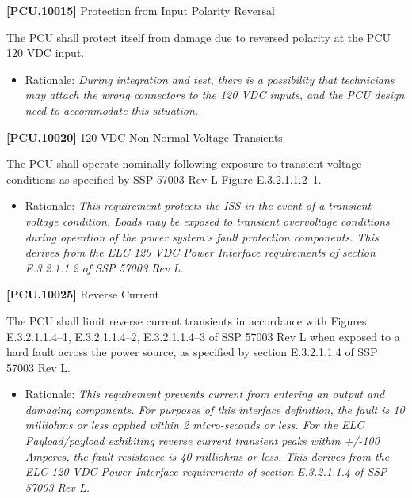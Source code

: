\documentclass[12pt,oneside,oldfontcommands]{memoir}
\begin{document}
\textbf{[PCU.10015]} Protection from Input Polarity Reversal

The \gls{PCU} shall protect itself from damage due to reversed polarity at the \gls{PCU} 120 \gls{VDC} input.

\begin{itemize}
\item{} Rationale: \emph{During integration and test, there is a possibility that technicians may attach the wrong connectors to the 120 VDC inputs, and the PCU design need to accommodate this situation.}

\end{itemize}

\textbf{[PCU.10020]} 120 \gls{VDC} Non-Normal Voltage Transients

The \gls{PCU} shall operate nominally following exposure to transient voltage conditions as specified by SSP 57003 Rev L Figure E.3.2.1.1.2--1.

\begin{itemize}
\item{} Rationale: \emph{This requirement protects the ISS in the event of a transient voltage condition. Loads may be exposed to transient overvoltage conditions during operation of the power system's fault protection components. This derives from the ELC 120 VDC Power Interface requirements of section E.3.2.1.1.2 of SSP 57003 Rev L.}

\end{itemize}

\textbf{[PCU.10025]} Reverse Current

The \gls{PCU} shall limit reverse current transients in accordance with Figures E.3.2.1.1.4--1, E.3.2.1.1.4--2, E.3.2.1.1.4--3 of SSP 57003 Rev L when exposed to a hard fault across the power source, as specified by section E.3.2.1.1.4 of SSP 57003 Rev L.

\begin{itemize}
\item{} Rationale: \emph{This requirement prevents current from entering an output and damaging components. For purposes of this interface definition, the fault is 10 milliohms or less applied within 2 micro-seconds or less. For the ELC Payload\slash payload exhibiting reverse current transient peaks within +\slash -100 Amperes, the fault resistance is 40 milliohms or less. This derives from the ELC 120 VDC Power Interface requirements of section E.3.2.1.1.4 of SSP 57003 Rev L.}

\end{itemize}
\end{document}
